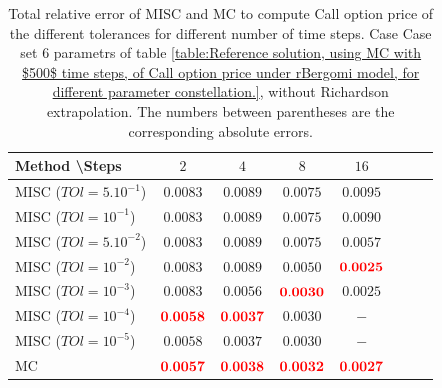 \documentclass[11pt]{article}
\begin{document}
\begin{table}[h!]
	\centering
	\begin{tabular}{l*{6}{c}r}
		Method \textbackslash  Steps            & $2$ & $4$ & $8$ & $16$  \\
		\hline
		MISC ($TOl=5.10^{-1}$)  & $\mathbf{0.0083}$ & $\mathbf{0.0089}$ & $\mathbf{ 0.0075}$ & $\mathbf{ 0.0095}$  \\
		MISC ($TOl=10^{-1}$)  &  $\mathbf{0.0083}$ & $\mathbf{0.0089}$& $\mathbf{ 0.0075}$ & $\mathbf{ 0.0090}$   \\
		MISC ($TOl=5.10^{-2}$)  & $\mathbf{0.0083}$ & $\mathbf{0.0089}$ & $\mathbf{ 0.0075}$ & $\mathbf{ 0.0057}$  \\
		MISC ($TOl=10^{-2}$)  &  $\mathbf{0.0083}$ & $\mathbf{0.0089}$& $\mathbf{ 0.0050}$ & $\mathbf{ {\color{red}0.0025}}$  \\
		MISC ($TOl=10^{-3}$)  &  $\mathbf{0.0083}$& $\mathbf{0.0056}$& $\mathbf{{\color{red}0.0030}}$  & $\mathbf{ 0.0025}$  \\
		MISC ($TOl=10^{-4}$)  &  $\mathbf{{\color{red}0.0058}}$ & $\mathbf{{\color{red}0.0037}}$& $\mathbf{0.0030}$ & $\mathbf{ -}$ \\
		MISC ($TOl=10^{-5}$)  &  $\mathbf{0.0058}$ & $\mathbf{0.0037}$& $\mathbf{0.0030}$ & $\mathbf{ -}$ 
		\\
		\hline
		MC    & $\mathbf{{\color{red}0.0057}}$  & $\mathbf{ {\color{red}0.0038}}$  & $\mathbf{{\color{red}0.0032}}$ & $\mathbf{ {\color{red}0.0027}}$  \\		
		\hline
	\end{tabular}
	\caption{Total relative error of MISC and MC to compute Call option price of the different tolerances for different number of time steps. Case Case set $6$ parametrs of table \ref{table:Reference solution, using MC with $500$ time steps, of Call option price under rBergomi model, for different parameter constellation.}, without Richardson extrapolation. The numbers between parentheses are the corresponding absolute errors.}
	\label{Total error of MISC and MC to compute Call option price of the different tolerances for different number of time steps. Case set 6, without Richardson extrapolation. The numbers between parentheses are the corresponding absolute errors.}
\end{table}
\end{document}
